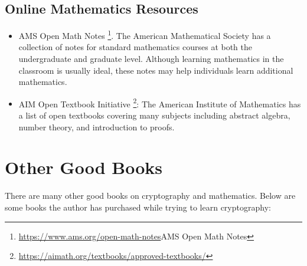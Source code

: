 \subsection{Online Mathematics Resources}
\label{sec:conclusion_online_math}

\begin{itemize}
\item AMS Open Math Notes%
    \footnote{\url{https://www.ams.org/open-math-notes}{AMS Open Math Notes}}.
    The American Mathematical Society has a collection of notes
    for standard mathematics courses at both the undergraduate
    and graduate level.
    Although learning mathematics in the classroom is usually ideal,
    these notes may help individuals learn additional
    mathematics.
\item AIM Open Textbook Initiative%
    \footnote{\url{https://aimath.org/textbooks/approved-textbooks/}}:
    The American Institute of Mathematics has a list of open textbooks
    covering many subjects including abstract algebra, \gls{number theory},
    and introduction to proofs.
\end{itemize}



\section{Other Good Books}

There are many other good books on cryptography and mathematics.
Below are some books the author has purchased while trying
to learn cryptography:

